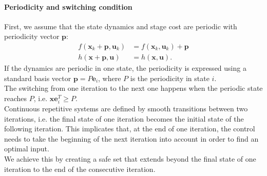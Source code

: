 \paragraph{Periodicity and switching condition} First, we assume that the state dynamics and stage cost are periodic with periodicity vector $\bm{p}$:
\begin{align}
f(\bm{x}_k+\bm{p},\bm{u}_k) &= f(\bm{x}_k,\bm{u}_k)+\bm{p}\\
h(\bm{x}+\bm{p},\bm{u}) &= h(\bm{x},\bm{u}).
\end{align}
If the dynamics are periodic in one state, the periodicity is expressed using a standard basis vector $\bm{p}=P\bm{e}_i$, where $P$ is the periodicity in state $i$.\\
The switching from one iteration to the next one happens when the periodic state reaches $P$, i.e. $\bm{xe}_i^T\geq P$.\\
Continuous repetitive systems are defined by smooth transitions between two iterations, i.e. the final state of one iteration becomes the initial state of the following iteration. This implicates that, at the end of one iteration, the control needs to take the beginning of the next iteration into account in order to find an optimal input.\\
We achieve this by creating a safe set that extends beyond the final state of one iteration to the end of the consecutive iteration.

